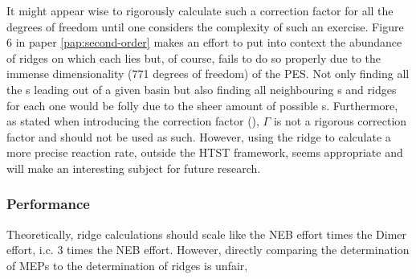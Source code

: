 It might appear wise to rigorously calculate such a correction factor for all the degrees of freedom until one considers the complexity of such an exercise.
Figure 6 in paper \ref{pap:second-order} makes an effort to put into context the abundance of ridges on which each  lies but, of course, fails to do so properly due to the immense dimensionality (771 degrees of freedom) of the PES.
Not only finding all the s leading out of a given basin but also finding all neighbouring s and ridges for each one would be folly due to the sheer amount of possible \sap{}s.
Furthermore, as stated when introducing the correction factor (), $\Gamma$ is not a rigorous correction factor and should not be used as such.
However, using the ridge to calculate a more precise reaction rate, outside the HTST framework, seems appropriate and will make an interesting subject for future research.

\subsubsection{Performance}
Theoretically, ridge calculations should scale like the NEB effort times the Dimer effort, i.c. 3 times the NEB effort.
However, directly comparing the determination of MEPs to the determination of ridges is unfair, \expand

